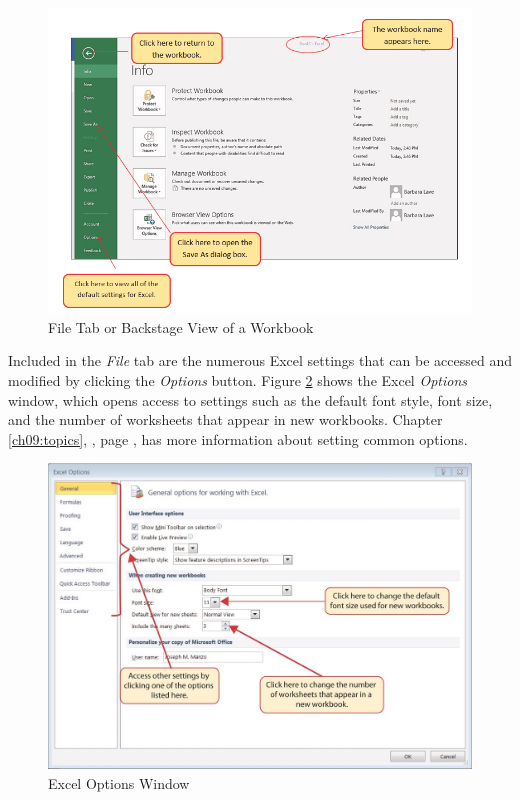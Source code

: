 \begin{figure}[H]
	\centering
	\includegraphics[width=\maxwidth{.95\linewidth}]{gfx/ch01_fig09}
	\caption{File Tab or Backstage View of a Workbook}
	\label{01:fig09}
\end{figure}

Included in the \textit{File} tab are the numerous Excel settings that can be accessed and modified by clicking the \textit{Options} button. Figure \ref{01:fig10} shows the Excel \textit{Options} window, which opens access to settings such as the default font style, font size, and the number of worksheets that appear in new workbooks. Chapter \ref{ch09:topics}, , page \pageref{ch09:topics}, has more information about setting common options.

\begin{figure}[H]
	\centering
	\includegraphics[width=\maxwidth{.95\linewidth}]{gfx/ch01_fig10}
	\caption{Excel Options Window}
	\label{01:fig10}
\end{figure}

